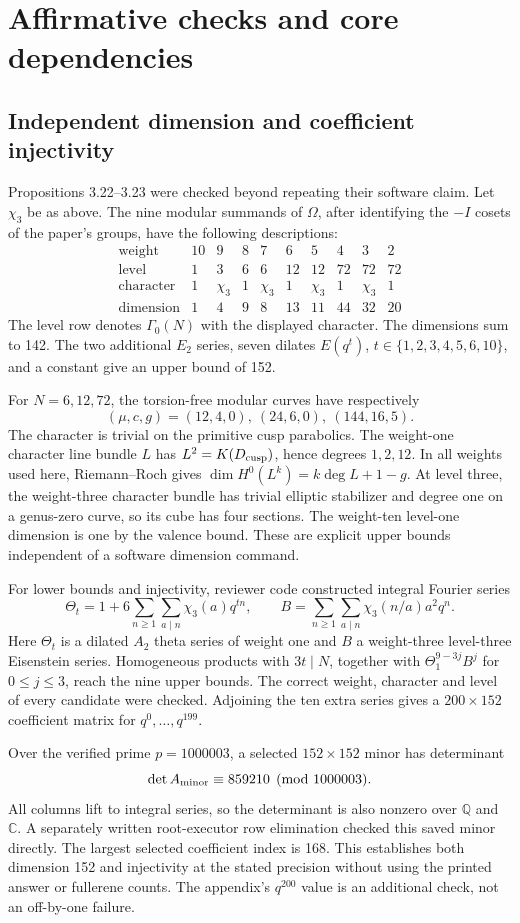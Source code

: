 \documentclass[10pt]{article}
\begin{document}
\section*{Affirmative checks and core dependencies}
\subsection*{Independent dimension and coefficient injectivity}
Propositions 3.22–3.23 were checked beyond repeating their software claim. Let \(\chi_3\) be as above. The nine modular summands of \(\Omega\), after identifying the \(-I\) cosets of the paper’s groups, have the following descriptions: \[\begin{array}{c|ccccccccc}
\text{weight}&10&9&8&7&6&5&4&3&2\\ \hline
\text{level}&1&3&6&6&12&12&72&72&72\\
\text{character}&1&\chi_3&1&\chi_3&1&\chi_3&1&\chi_3&1\\
\text{dimension}&1&4&9&8&13&11&44&32&20
\end{array}\] The level row denotes \(\Gamma_0(N)\) with the displayed character. The dimensions sum to 142. The two additional \(E_2\) series, seven dilates \(E(q^t)\), \(t\in\{1,2,3,4,5,6,10\}\), and a constant give an upper bound of 152.\par
For \(N=6,12,72\), the torsion-free modular curves have respectively \[(\mu,c,g)=(12,4,0),\ (24,6,0),\ (144,16,5).\] The character is trivial on the primitive cusp parabolics. The weight-one character line bundle \(L\) has \(L^2=K(D_{\rm cusp})\), hence degrees \(1,2,12\). In all weights used here, Riemann–Roch gives \(\dim H^0(L^k)=k\deg L+1-g\). At level three, the weight-three character bundle has trivial elliptic stabilizer and degree one on a genus-zero curve, so its cube has four sections. The weight-ten level-one dimension is one by the valence bound. These are explicit upper bounds independent of a software dimension command.\par
For lower bounds and injectivity, reviewer code constructed integral Fourier series \[\Theta_t=1+6\sum_{n\ge1}\sum_{a\mid n}\chi_3(a)q^{tn},
 \qquad
 B=\sum_{n\ge1}\sum_{a\mid n}\chi_3(n/a)a^2q^n.\] Here \(\Theta_t\) is a dilated \(A_2\) theta series of weight one and \(B\) a weight-three level-three Eisenstein series. Homogeneous products with \(3t\mid N\), together with \(\Theta_1^{9-3j}B^j\) for \(0\le j\le3\), reach the nine upper bounds. The correct weight, character and level of every candidate were checked. Adjoining the ten extra series gives a \(200\times152\) coefficient matrix for \(q^0,\ldots,q^{199}\).\par
Over the verified prime \(p=1000003\), a selected \(152\times152\) minor has determinant \[\det A_{\rm minor}\equiv859210\pmod{1000003}.\] All columns lift to integral series, so the determinant is also nonzero over \(\mathbb Q\) and \(\mathbb C\). A separately written root-executor row elimination checked this saved minor directly. The largest selected coefficient index is 168. This establishes both dimension 152 and injectivity at the stated precision without using the printed answer or fullerene counts. The appendix’s \(q^{200}\) value is an additional check, not an off-by-one failure.\par
\end{document}
